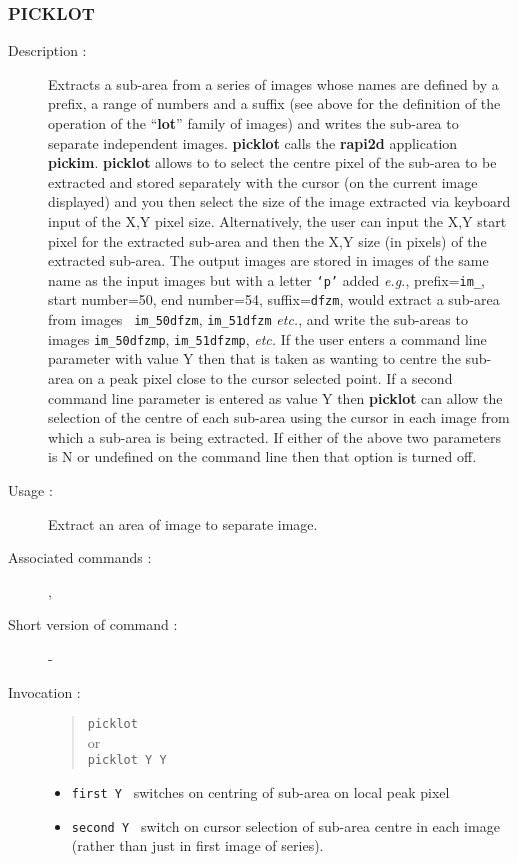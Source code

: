 \subsubsection*{\label{PICKLOT}PICKLOT}

\begin{description}

\item[Description :] Extracts a sub-area from a series of images whose
names are defined by a prefix, a range of numbers and a suffix (see
above for the definition of the operation of the ``{\bf lot}'' family
of images) and writes the sub-area to separate independent images.
{\bf picklot} calls the {\bf rapi2d} application {\bf pickim}.  {\bf
picklot} allows to to select the centre pixel of the sub-area to be
extracted and stored separately with the cursor (on the current image
displayed) and you then select the size of the image extracted via
keyboard input of the X,Y pixel size.  Alternatively, the user can
input the X,Y start pixel for the extracted sub-area and then the X,Y
size (in pixels) of the extracted sub-area.  The output images are
stored in images of the same name as the input images but with a letter
{\tt `p'} added \emph{e.g.}, prefix={\tt im\_}, start number=50, end
number=54, suffix={\tt dfzm}, would extract a sub-area from images {\tt
im\_50dfzm}, {\tt im\_51dfzm} \emph{etc.}, and write the sub-areas to
images {\tt im\_50dfzmp}, {\tt im\_51dfzmp}, \emph{etc.}  If the user
enters a command line parameter with value Y then that is taken as
wanting to centre the sub-area on a peak pixel close to the cursor
selected point.  If a second command line parameter is entered as value
Y then {\bf picklot} can allow the selection of the centre of each
sub-area using the cursor in each image from which a sub-area is being
extracted.  If either of the above two parameters is N or undefined on
the command line then that option is turned off.

\item[Usage :] Extract an area of image to separate image.
\item[Associated commands :] {\tt {}}, 
{\tt {}}
\item[Short version of command :] -
\item[Invocation :]

\begin{quote}{\tt  picklot }\\
or \\
{\tt picklot Y Y }
\end{quote}

\begin{itemize}

\item {\tt first Y } switches on centring of sub-area on local peak pixel
\item {\tt second Y } switch on cursor selection of sub-area centre in
 each image (rather than just in first image of series).
\end{itemize}

\end{description}

